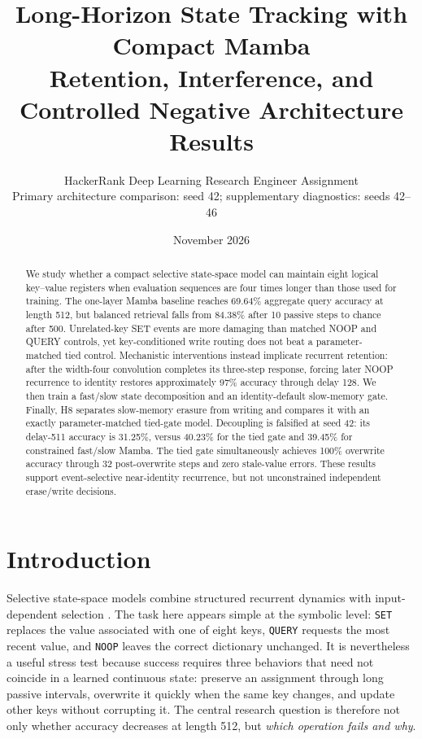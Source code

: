 \documentclass[10pt,a4paper]{article}
\title{\vspace{-1.8em}\textbf{Long-Horizon State Tracking with Compact Mamba}\\[-0.05em]
\large Retention, Interference, and Controlled Negative Architecture Results}
\author{HackerRank Deep Learning Research Engineer Assignment\\
\small Primary architecture comparison: seed 42; supplementary diagnostics: seeds 42--46}
\date{November 2026}
\newcommand{\SET}{\texttt{SET}}
\newcommand{\QUERY}{\texttt{QUERY}}
\newcommand{\NOOP}{\texttt{NOOP}}
\begin{document}
\maketitle
\vspace{-1.45em}
\fontsize{9.4pt}{10.9pt}\selectfont

\begin{abstract}\small
We study whether a compact selective state-space model can maintain eight logical key--value registers when evaluation sequences are four times longer than those used for training. The one-layer Mamba baseline reaches 69.64\% aggregate query accuracy at length 512, but balanced retrieval falls from 84.38\% after 10 passive steps to chance after 500. Unrelated-key SET events are more damaging than matched NOOP and QUERY controls, yet key-conditioned write routing does not beat a parameter-matched tied control. Mechanistic interventions instead implicate recurrent retention: after the width-four convolution completes its three-step response, forcing later NOOP recurrence to identity restores approximately 97\% accuracy through delay 128. We then train a fast/slow state decomposition and an identity-default slow-memory gate. Finally, H8 separates slow-memory erasure from writing and compares it with an exactly parameter-matched tied-gate model. Decoupling is falsified at seed 42: its delay-511 accuracy is 31.25\%, versus 40.23\% for the tied gate and 39.45\% for constrained fast/slow Mamba. The tied gate simultaneously achieves 100\% overwrite accuracy through 32 post-overwrite steps and zero stale-value errors. These results support event-selective near-identity recurrence, but not unconstrained independent erase/write decisions.
\end{abstract}

\section{Introduction}
Selective state-space models combine structured recurrent dynamics with input-dependent selection \cite{s4,mamba}. The task here appears simple at the symbolic level: \SET{} replaces the value associated with one of eight keys, \QUERY{} requests the most recent value, and \NOOP{} leaves the correct dictionary unchanged. It is nevertheless a useful stress test because success requires three behaviors that need not coincide in a learned continuous state: preserve an assignment through long passive intervals, overwrite it quickly when the same key changes, and update other keys without corrupting it. The central research question is therefore not only whether accuracy decreases at length 512, but \emph{which operation fails and why}.
\end{document}
